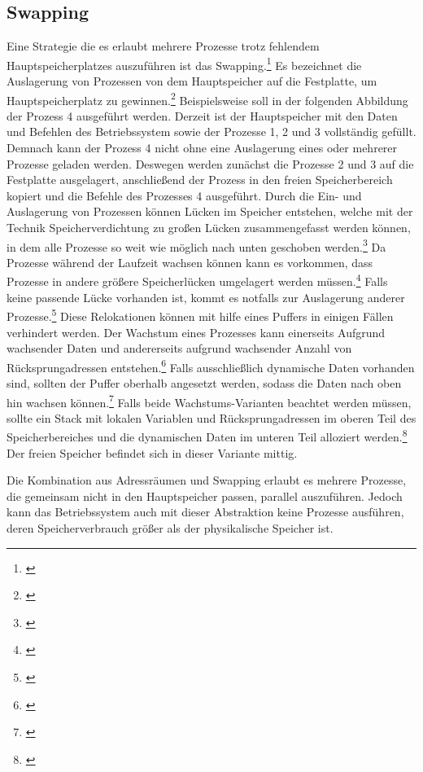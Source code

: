 \subsection{Swapping}
\label{subsec:Swapping}
Eine Strategie die es erlaubt mehrere Prozesse trotz fehlendem Hauptspeicherplatzes auszuführen ist das Swapping.\footnote{\cite[S.~245]{Tanenbaum.2016}} Es bezeichnet die Auslagerung von Prozessen von dem Hauptspeicher auf die Festplatte, um Hauptspeicherplatz zu gewinnen.\footnote{\cite[S.~245]{Tanenbaum.2016}} Beispielsweise soll in der folgenden Abbildung der Prozess 4 ausgeführt werden. Derzeit ist der Hauptspeicher mit den Daten und Befehlen des Betriebssystem sowie der Prozesse 1, 2 und 3 vollständig gefüllt. Demnach kann der Prozess 4 nicht ohne eine Auslagerung eines oder mehrerer Prozesse geladen werden. Deswegen werden zunächst die Prozesse 2 und 3 auf die Festplatte ausgelagert, anschließend der Prozess in den freien Speicherbereich kopiert und die Befehle des Prozesses 4 ausgeführt. Durch die Ein- und Auslagerung von Prozessen können Lücken im Speicher entstehen, welche mit der Technik Speicherverdichtung zu großen Lücken zusammengefasst werden können, in dem alle Prozesse so weit wie möglich nach unten geschoben werden.\footnote{\cite[S.~246]{Tanenbaum.2016}} Da Prozesse während der Laufzeit wachsen können kann es vorkommen, dass Prozesse in andere größere Speicherlücken umgelagert werden müssen.\footnote{\cite[S.~247]{Tanenbaum.2016}} Falls keine passende Lücke vorhanden ist, kommt es notfalls zur Auslagerung anderer Prozesse.\footnote{\cite[S.~247]{Tanenbaum.2016}} Diese Relokationen können mit hilfe eines Puffers in einigen Fällen verhindert werden. Der Wachstum eines Prozesses kann einerseits Aufgrund wachsender Daten und andererseits aufgrund wachsender Anzahl von Rücksprungadressen entstehen.\footnote{\cite[S.~247]{Tanenbaum.2016}} Falls ausschließlich dynamische Daten vorhanden sind, sollten der Puffer oberhalb angesetzt werden, sodass die Daten nach oben hin wachsen können.\footnote{\cite[S.~247]{Tanenbaum.2016}} Falls beide Wachstums-Varianten beachtet werden müssen, sollte ein Stack mit lokalen Variablen und Rücksprungadressen im oberen Teil des Speicherbereiches und die dynamischen Daten im unteren Teil alloziert werden.\footnote{\cite[S.~247]{Tanenbaum.2016}} Der freien Speicher befindet sich in dieser Variante mittig.

Die Kombination aus Adressräumen und Swapping erlaubt es mehrere Prozesse, die gemeinsam nicht in den Hauptspeicher passen, parallel auszuführen. Jedoch kann das Betriebssystem auch mit dieser Abstraktion keine Prozesse ausführen, deren Speicherverbrauch größer als der physikalische Speicher ist.

